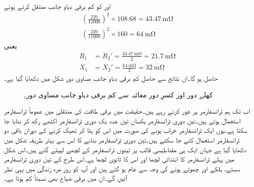  اور  کو کم برقی دباو جانب منتقل کرتے ہوئے 
\begin{align*}
\left(\frac{220}{11000} \right)^2 \times 108.68=\SI{43.47}{\milli \ohm}\\
\left(\frac{220}{11000} \right)^2 \times 160=\SI{64}{\milli \ohm}
\end{align*}
یعنی
\begin{align*}
R_1&=R_2'=\frac{\SI{43.47}{\milli \ohm}}{2}=\SI{21.7}{\milli \ohm}\\
X_1&=X_2'=\frac{\SI{64}{\milli \ohm}}{2}=\SI{32}{\milli \ohm}
\end{align*}
حاصل ہو گا۔ان نتائج سے حاصل کم برقی دباو جانب مساوی دور شکل  میں دکھایا گیا ہے۔
\begin{figure}
\centering
\caption{کھلے دور اور کسرِ دور معائنہ سے کم برقی دباو جانب  مساوی دور۔}
\label{شکل_ٹرانسفارمر_کھلے_سرے_کسر_دور_مثال}
\end{figure}
%
اب تک ہم   ٹرانسفارمر پر غور کرتے رہے ہیں۔حقیقت میں برقی طاقت کی منتقلی میں عموماً  ٹرانسفارمر استعمال ہوتے ہیں۔تین دوری ٹرانسفارمر یکساں تین عدد  یک دوری  ٹرانسفارمر اکٹھے رکھ کر بنایا جا سکتا ہے۔یوں  ایک ٹرانسفارمر خراب ہونے کی صورت میں  اس کو ہٹا کر ٹھیک کرنے کے دوران  باقی دو ٹرانسفارمر استعمال  کئے جا سکتے ہیں۔تین دوری ٹرانسفارمر بنانے کا اس سے بہتر طریقہ شکل  میں دکھایا گیا ہے جہاں ایک ہی مقناطیسی قالب پر تینوں ٹرانسفارمر کے لچھے لپیٹے گئے ہیں۔اس شکل میں  پہلے ٹرانسفارمر کا ابتدائی لچھا اور  اس کا ثانوی لچھا ہے۔اس طرح کے تین دوری ٹرانسفارمر سستے، ہلکے اور چھوٹے ہونے کی وجہ سے عام ہو گئے ہیں اور آپ کو روز مرہ زندگی میں یہی نظر آئیں گے۔ان میں برقی ضیاع بھی نسبتاً  کم ہوتا ہے۔

